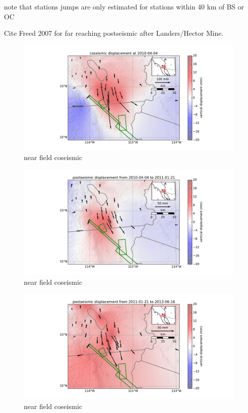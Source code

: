 \documentclass[12pt]{article}
\begin{document}
note that stations jumps are only estimated for stations within 40 km of BS or OC



         


Cite Freed 2007 for far reaching postseismic after Landers/Hector Mine.

\begin{figure}
\includegraphics[scale=0.6]{Figures/near_field_data_1}
\centering 
\caption{near field coseismic}
\label{nearfield1}
\end{figure}

\begin{figure}
\includegraphics[scale=0.6]{Figures/near_field_data_2}
\centering 
\caption{near field coseismic}
\label{nearfield2}
\end{figure}

\begin{figure}
\includegraphics[scale=0.6]{Figures/near_field_data_3}
\centering 
\caption{near field coseismic}
\label{nearfield3}
\end{figure}
\end{document}
